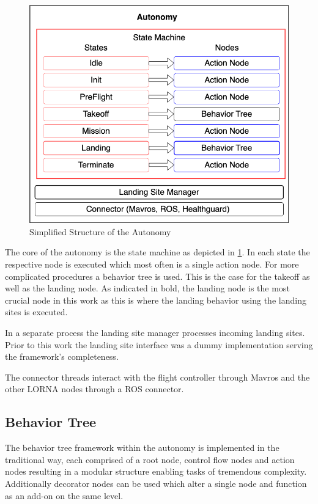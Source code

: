 \begin{figure}[ht!]
    \centering
    \includegraphics[scale=0.45]{images/setup/autonomy.png}
    \caption{Simplified Structure of the Autonomy}
    \label{fig:autonomy}
\end{figure}

The core of the autonomy is the state machine as depicted in \cref{fig:autonomy}. In each state the respective node is executed which most often is a single action node. For more complicated procedures a behavior tree is used. This is the case for the takeoff as well as the landing node. As indicated in bold, the landing node is the most crucial node in this work as this is where the landing behavior using the landing sites is executed.

In a separate process the landing site manager processes incoming landing sites. Prior to this work the landing site interface was a dummy implementation serving the framework's completeness.

The connector threads interact with the flight controller through Mavros and the other LORNA nodes through a ROS connector.

\subsection{Behavior Tree}\label{subsec:setup:behavior_tree}

The behavior tree framework within the autonomy is implemented in the traditional way, each comprised of a root node, control flow nodes and action nodes resulting in a modular structure enabling tasks of tremendous complexity. Additionally decorator nodes can be used which alter a single node and function as an add-on on the same level.

